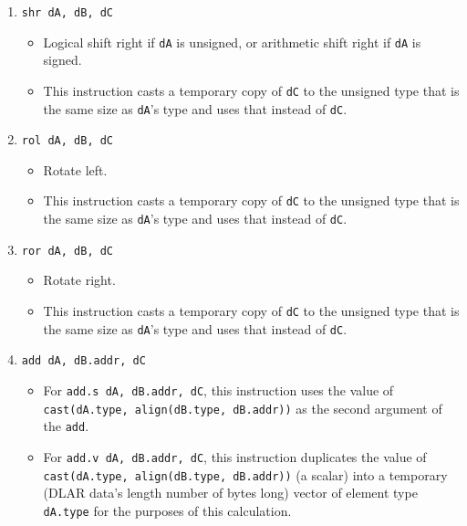 \documentclass{article}
\begin{document}
\begin{itemize}
\begin{enumerate}
			\item \texttt{shr dA, dB, dC}
				\begin{itemize}
				\item Logical shift right if \texttt{dA} is unsigned, or
					arithmetic shift right if \texttt{dA} is signed.
				\item This instruction casts a temporary copy of
					\texttt{dC} to the unsigned type that is the same size
					as \texttt{dA}'s type and uses that instead of
					\texttt{dC}.
				\end{itemize}
			\item \texttt{rol dA, dB, dC}
				\begin{itemize}
				\item Rotate left.
				\item This instruction casts a temporary copy of
					\texttt{dC} to the unsigned type that is the same size
					as \texttt{dA}'s type and uses that instead of
					\texttt{dC}.
				\end{itemize}
			\item \texttt{ror dA, dB, dC}
				\begin{itemize}
				\item Rotate right.
				\item This instruction casts a temporary copy of
					\texttt{dC} to the unsigned type that is the same size
					as \texttt{dA}'s type and uses that instead of
					\texttt{dC}.
				\end{itemize}
			\item \texttt{add dA, dB.addr, dC}
				\begin{itemize}
				\item For \texttt{add.s dA, dB.addr, dC}, this instruction
					uses the value of
					\texttt{cast(dA.type, align(dB.type, dB.addr))}
					as the second argument of the \texttt{add}.
				\item For \texttt{add.v dA, dB.addr, dC}, this instruction
					duplicates the value of
					\texttt{cast(dA.type, align(dB.type, dB.addr))}
					(a scalar) into a temporary (DLAR data's length number
					of bytes long) vector of element type \texttt{dA.type}
					for the purposes of this calculation.
				\end{itemize}


\end{enumerate}
\end{itemize}
\end{document}
